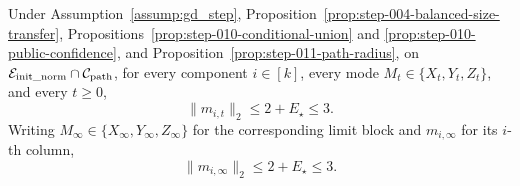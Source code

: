 \begin{proposition}
\label{prop:step-011-uniform-factor-radius}
Under Assumption~\ref{assump:gd_step}, Proposition~\ref{prop:step-004-balanced-size-transfer}, Propositions~\ref{prop:step-010-conditional-union} and
\ref{prop:step-010-public-confidence}, and
Proposition~\ref{prop:step-011-path-radius}, on
\(\mathcal E_{\rm init\_norm}\cap\mathcal C_{\rm path}\), for every
component \(i\in[k]\), every mode
\(M_t\in\{X_t,Y_t,Z_t\}\), and every \(t\ge0\),
\begin{equation}
  \|m_{i,t}\|_2\le2+E_\star\le3.                       \label{eq:step-011-4}
\end{equation}
Writing \(M_\infty\in\{X_\infty,Y_\infty,Z_\infty\}\) for the
corresponding limit block and \(m_{i,\infty}\) for its \(i\)-th column,
\begin{equation}
  \|m_{i,\infty}\|_2\le2+E_\star\le3.                 \label{eq:step-011-5}
\end{equation}

\end{proposition}

